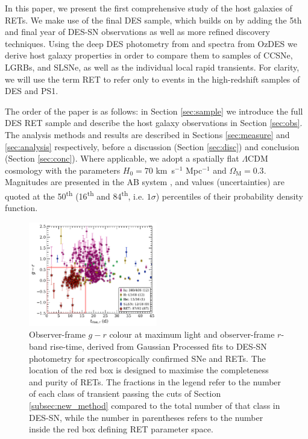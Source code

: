\documentclass[fleqn,usenatbib,]{mnras}
\begin{document}
In this paper, we present the first comprehensive study of the host galaxies of RETs. We make use of the final DES sample, which builds on  by adding the 5th and final year of DES-SN observations as well as more refined discovery techniques. Using the deep DES photometry from \citet[hereafter W20]{Wiseman2020} and spectra from OzDES \citep{Lidman2020} we derive host galaxy properties in order to compare them to samples of CCSNe, LGRBs, and SLSNe, as well as the individual local rapid transients. For clarity, we will use the term RET to refer only to events in the high-redshift samples of DES and PS1. 

The order of the paper is as follows: in Section \ref{sec:sample} we introduce the full DES RET sample and describe the host galaxy observations in Section \ref{sec:obs}. The analysis methods and results are described in Sections \ref{sec:measure} and \ref{sec:analysis} respectively, before a discussion (Section \ref{sec:disc}) and conclusion (Section \ref{sec:conc}).
Where applicable, we adopt a spatially flat $\Lambda$CDM cosmology with the parameters $H_0=70$ km~s$^{-1}$ Mpc$^{-1}$ and $\Omega_{\textrm{M}}=0.3$. Magnitudes are presented in the AB system \citep{Oke1983}, and values (uncertainties) are quoted at the 50\textsuperscript{th} (16\textsuperscript{th} and 84\textsuperscript{th}, i.e. $1\sigma$) percentiles of their probability density function.

\begin{figure}
\includegraphics[width=0.5\textwidth]{figs/spec_gr_trise_r_GP5_new_colorscheme.pdf}
\caption{Observer-frame $g-r$ colour at maximum light and observer-frame $r$-band rise-time, derived from Gaussian Processed fits to DES-SN photometry for spectroscopically confirmed SNe and  RETs. The location of the red box is designed to maximise the completeness and purity of RETs. The fractions in the legend refer to the number of each class of transient passing the cuts of Section \ref{subsec:new_method} compared to the total number of that class in DES-SN, while the number in parentheses refers to the number inside the red box defining RET parameter space. 
\label{fig:selection}}
\end{figure}
\end{document}
